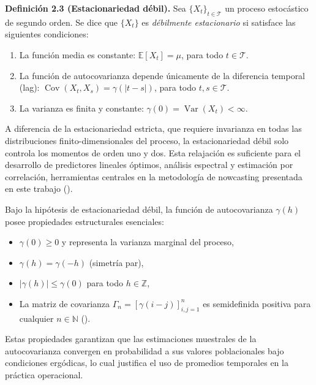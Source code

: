 \documentclass[
  spanish,
  us-letterpaper,
]{scrreprt}
\providecommand{\tightlist}{%
  \setlength{\itemsep}{0pt}\setlength{\parskip}{0pt}}
\numberwithin{equation}{section}
\begin{document}
\textbf{Definición 2.3 (Estacionariedad débil).} Sea
\(\{X_t\}_{t \in \mathcal{T}}\) un proceso estocástico de segundo orden.
Se dice que \(\{X_t\}\) es \emph{débilmente estacionario} si satisface
las siguientes condiciones:

\begin{enumerate}
\def\labelenumi{\arabic{enumi}.}
\tightlist
\item
  La función media es constante: \(\mathbb{E}[X_t] = \mu\), para todo
  \(t \in \mathcal{T}\).
\item
  La función de autocovarianza depende únicamente de la diferencia
  temporal (lag): \(\operatorname{Cov}(X_t, X_s) = \gamma(|t-s|)\), para
  todo \(t,s \in \mathcal{T}\).
\item
  La varianza es finita y constante:
  \(\gamma(0) = \operatorname{Var}(X_t) < \infty\).
\end{enumerate}

A diferencia de la estacionariedad estricta, que requiere invarianza en
todas las distribuciones finito-dimensionales del proceso, la
estacionariedad débil solo controla los momentos de orden uno y dos.
Esta relajación es suficiente para el desarrollo de predictores lineales
óptimos, análisis espectral y estimación por correlación, herramientas
centrales en la metodología de nowcasting presentada en este trabajo
().

Bajo la hipótesis de estacionariedad débil, la función de autocovarianza
\(\gamma(h)\) posee propiedades estructurales esenciales:

\begin{itemize}
\tightlist
\item
  \(\gamma(0) \geq 0\) y representa la varianza marginal del proceso,
\item
  \(\gamma(h) = \gamma(-h)\) (simetría par),
\item
  \(|\gamma(h)| \leq \gamma(0)\) para todo \(h \in \mathbb{Z}\),
\item
  La matriz de covarianza \(\Gamma_n = [\gamma(i-j)]_{i,j=1}^n\) es
  semidefinida positiva para cualquier \(n \in \mathbb{N}\)
  ().
\end{itemize}

Estas propiedades garantizan que las estimaciones muestrales de la
autocovarianza convergen en probabilidad a sus valores poblacionales
bajo condiciones ergódicas, lo cual justifica el uso de promedios
temporales en la práctica operacional.
\end{document}
